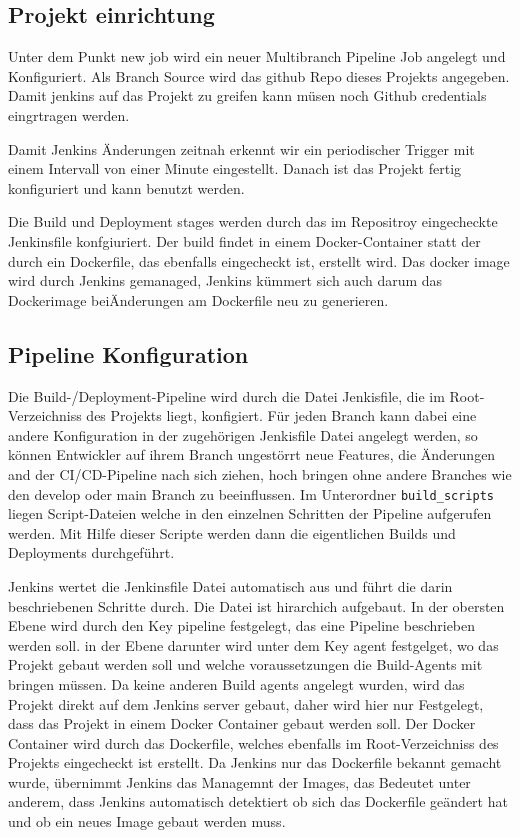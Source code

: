 \subsection{Projekt einrichtung}

Unter dem Punkt \glqq new job\grqq{} wird ein neuer Multibranch Pipeline Job angelegt und Konfiguriert. Als Branch Source wird das github Repo dieses Projekts angegeben. Damit jenkins auf das Projekt zu greifen kann müsen noch Github credentials eingrtragen werden.

Damit Jenkins Änderungen zeitnah erkennt wir ein periodischer Trigger mit einem Intervall von einer Minute eingestellt. Danach ist das Projekt fertig konfiguriert und kann benutzt werden.

Die Build und Deployment stages werden durch das im Repositroy eingecheckte Jenkinsfile konfgiuriert. Der build findet in einem Docker-Container statt der durch ein Dockerfile, das ebenfalls eingecheckt ist, erstellt wird. Das docker image wird durch Jenkins gemanaged, Jenkins kümmert sich auch darum das Dockerimage beiÄnderungen am Dockerfile neu zu generieren.

\subsection{Pipeline Konfiguration}

Die Build-/Deployment-Pipeline wird durch die Datei Jenkisfile, die im Root-Verzeichniss des Projekts liegt, konfigiert. Für jeden Branch kann dabei eine andere Konfiguration in der zugehörigen Jenkisfile Datei angelegt werden, so können Entwickler auf ihrem Branch ungestörrt neue Features, die Änderungen and der CI/CD-Pipeline nach sich ziehen, hoch bringen ohne andere Branches wie den develop oder main Branch zu beeinflussen.
Im Unterordner \lstinline{build_scripts} liegen Script-Dateien welche in den einzelnen Schritten der Pipeline aufgerufen werden. Mit Hilfe dieser Scripte werden dann die eigentlichen Builds und Deployments durchgeführt.

Jenkins wertet die Jenkinsfile Datei automatisch aus und führt die darin beschriebenen Schritte durch. Die Datei ist hirarchich aufgebaut. In der obersten Ebene wird durch den Key \glqq pipeline\grqq{} festgelegt, das eine Pipeline beschrieben werden soll. in der Ebene darunter wird unter dem Key \glqq  agent\grqq{} festgelget, wo das Projekt gebaut werden soll und welche voraussetzungen die Build-Agents mit bringen müssen. Da keine anderen Build agents angelegt wurden, wird das Projekt direkt auf dem Jenkins server gebaut, daher wird hier nur Festgelegt, dass das Projekt in einem Docker Container gebaut werden soll. Der Docker Container wird durch das Dockerfile, welches ebenfalls im Root-Verzeichniss des Projekts eingecheckt ist erstellt. Da Jenkins nur das Dockerfile bekannt gemacht wurde, übernimmt Jenkins das Managemnt der Images, das Bedeutet unter anderem, dass Jenkins automatisch detektiert ob sich das Dockerfile geändert hat und ob ein neues Image gebaut werden muss.


